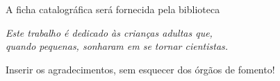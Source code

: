 \documentclass[
	oldfontcommands,
	sumario=abnt-6027-2012,
	12pt,			%
	openright,		%
	oneside,		%
	a4paper,		%
	english,		%
	brazil			%
	]{imecc-unicamp}
\begin{document}
\begin{fichacatalografica}
    \begin{center}
	{\ABNTEXchapterfont\large A ficha catalográfica será fornecida pela biblioteca}
    \end{center}
%     
\end{fichacatalografica}
\begin{folhadeaprovacao}
%     
\end{folhadeaprovacao}
\begin{dedicatoria}
   \vspace*{\fill}
   \centering
   \noindent
   \textit{
      Este trabalho é dedicado às crianças adultas que,\\
      quando pequenas, sonharam em se tornar cientistas.
   }
   \vspace*{\fill}
\end{dedicatoria}
\begin{agradecimentos}
Inserir os agradecimentos, sem esquecer dos órgãos de fomento!
\end{agradecimentos}
\end{document}
